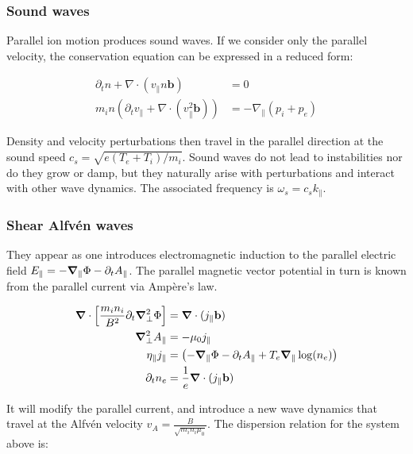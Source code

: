 \subsubsection{Sound waves}

Parallel ion motion produces sound waves. If we consider only the parallel velocity, the conservation equation can be expressed in a reduced form:

\begin{align}
	\partial_t n + \nabla \cdot (v_\parallel n\mathbf{b}) &= 0 \\
	m_i n \left(\partial_t v_\parallel + \nabla \cdot \left(v_\parallel^2 \mathbf{b}\right)\right) &= -\nabla_\parallel (p_i + p_e)
\end{align}

Density and velocity perturbations then travel in the parallel direction at the sound speed $ c_s = \sqrt{e(T_e + T_i)/m_i} $. Sound waves do not lead to instabilities nor do they grow or damp, but they naturally arise with perturbations and interact with other wave dynamics. The associated frequency is $\omega_s = c_s k_\parallel$.


\subsubsection{Shear Alfvén waves}
\label{ssec:edge_shearAlfvenWaves}

They appear as one introduces electromagnetic induction to the parallel electric field $E_\parallel = -\grad_\parallel \Phi - \partial_t A_\parallel$. The parallel magnetic vector potential in turn is known from the parallel current via Ampère's law.

\begin{align}
	\grad\cdot\left[\frac{m_i n_i}{ B^2}\partial_t\grad^2_\perp\Phi\right] &= \grad\cdot(j_\parallel\mathbf{b}) \\
	\grad^2_\perp A_\parallel &= -\mu_0j_\parallel \\
	\eta_\parallel j_\parallel &= \left(-\grad_\parallel\Phi - \partial_t A_\parallel + T_e\grad_\parallel\log(n_e)\right) \\
	\partial_t n_e &= \frac{1}{e}\grad\cdot (j_\parallel\mathbf{b}) 
	\label{eq:fourFieldModel}
\end{align}

It will modify the parallel current, and introduce a new wave dynamics that travel at the Alfvén velocity $v_A = \frac{B}{\sqrt{m_in_i\mu_0}}$. The dispersion relation for the system above is:

